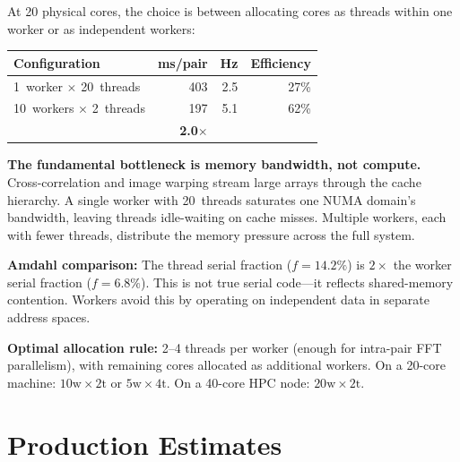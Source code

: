 \documentclass[10pt,a4paper,twocolumn]{article}
\begin{document}
At 20 physical cores, the choice is between allocating cores as threads within one worker or as independent workers:

\begin{center}
\small
\begin{tabular}{@{}lrrr@{}}
\toprule
\textbf{Configuration} & \textbf{ms/pair} & \textbf{Hz} & \textbf{Efficiency} \\
\midrule
1~worker $\times$ 20~threads  & 403 & 2.5 & 27\% \\
10~workers $\times$ 2~threads & 197 & 5.1 & 62\% \\
\addlinespace[2pt]
\multicolumn{2}{@{}l}{\textbf{Worker advantage:}} & \textbf{2.0$\times$} & \\
\bottomrule
\end{tabular}
\end{center}

\textbf{The fundamental bottleneck is memory bandwidth, not compute.} Cross-correlation and image warping stream large arrays through the cache hierarchy. A single worker with 20~threads saturates one NUMA domain's bandwidth, leaving threads idle-waiting on cache misses. Multiple workers, each with fewer threads, distribute the memory pressure across the full system.

\textbf{Amdahl comparison:} The thread serial fraction ($f{=}14.2\%$) is $2\times$ the worker serial fraction ($f{=}6.8\%$). This is not true serial code---it reflects shared-memory contention. Workers avoid this by operating on independent data in separate address spaces.

\textbf{Optimal allocation rule:} 2--4 threads per worker (enough for intra-pair FFT parallelism), with remaining cores allocated as additional workers. On a 20-core machine: $10\text{w} \times 2\text{t}$ or $5\text{w} \times 4\text{t}$. On a 40-core HPC node: $20\text{w} \times 2\text{t}$.

\section{Production Estimates}
\end{document}
